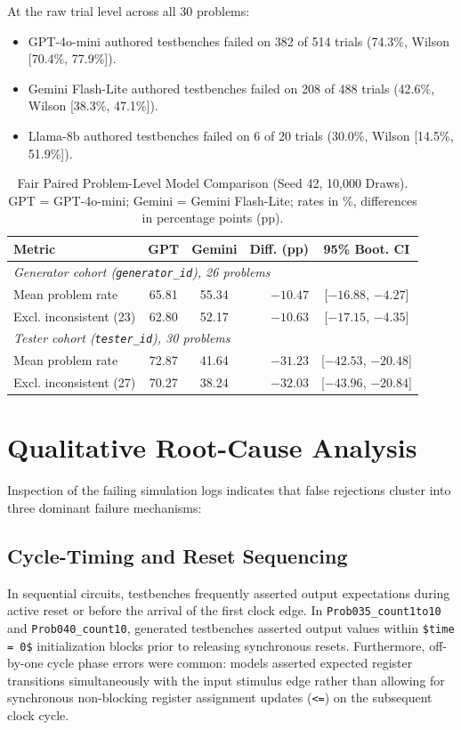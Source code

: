 \documentclass[conference]{IEEEtran}
\begin{document}
At the raw trial level across all 30 problems:
\begin{itemize}
    \item GPT-4o-mini authored testbenches failed on 382 of 514 trials (74.3\%, Wilson [70.4\%, 77.9\%]).
    \item Gemini Flash-Lite authored testbenches failed on 208 of 488 trials (42.6\%, Wilson [38.3\%, 47.1\%]).
    \item Llama-8b authored testbenches failed on 6 of 20 trials (30.0\%, Wilson [14.5\%, 51.9\%]).
\end{itemize}

\begin{table}[t]
\centering
\caption{Fair Paired Problem-Level Model Comparison (Seed 42, 10,000 Draws). GPT = GPT-4o-mini; Gemini = Gemini Flash-Lite; rates in \%, differences in percentage points (pp).}
\label{tab:model_comparison}
\footnotesize
\setlength{\tabcolsep}{3pt}
\begin{tabular}{lccrc}
\toprule
\textbf{Metric} & \textbf{GPT} & \textbf{Gemini} & \textbf{Diff. (pp)} & \textbf{95\% Boot. CI} \\
\midrule
\multicolumn{5}{l}{\textit{Generator cohort (\texttt{generator\_id}), 26 problems}} \\
Mean problem rate     & 65.81 & 55.34 & $-10.47$ & [$-16.88$, $-4.27$] \\
Excl. inconsistent (23) & 62.80 & 52.17 & $-10.63$ & [$-17.15$, $-4.35$] \\
\midrule
\multicolumn{5}{l}{\textit{Tester cohort (\texttt{tester\_id}), 30 problems}} \\
Mean problem rate     & 72.87 & 41.64 & $-31.23$ & [$-42.53$, $-20.48$] \\
Excl. inconsistent (27) & 70.27 & 38.24 & $-32.03$ & [$-43.96$, $-20.84$] \\
\bottomrule
\end{tabular}
\end{table}

\section{Qualitative Root-Cause Analysis}
Inspection of the failing simulation logs indicates that false rejections cluster into three dominant failure mechanisms:

\subsection{Cycle-Timing and Reset Sequencing}
In sequential circuits, testbenches frequently asserted output expectations during active reset or before the arrival of the first clock edge. In \texttt{Prob035\_count1to10} and \texttt{Prob040\_count10}, generated testbenches asserted output values within \texttt{\$time = 0\$} initialization blocks prior to releasing synchronous resets. Furthermore, off-by-one cycle phase errors were common: models asserted expected register transitions simultaneously with the input stimulus edge rather than allowing for synchronous non-blocking register assignment updates (\texttt{<=}) on the subsequent clock cycle.
\end{document}
